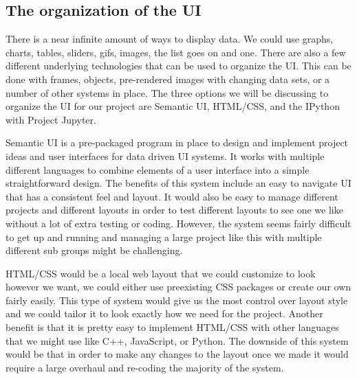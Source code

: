 \documentclass[10pt,draftclsnofoot,onecolumn]{IEEEtran}
\begin{document}
\subsection{The organization of the UI}

There is a near infinite amount of ways to display data. We could use graphs, charts, tables, sliders, gifs, images, the list goes on and one. There are also a few different underlying technologies that can be used to organize the UI. This can be done with frames, objects, pre-rendered images with changing data sets, or a number of other systems in place. The three options we will be discussing to organize the UI for our project are Semantic UI, HTML/CSS, and the IPython with Project Jupyter. \par

Semantic UI is a pre-packaged program in place to design and implement project ideas and user interfaces for data driven UI systems. It works with multiple different languages to combine elements of a user interface into a simple straightforward design. The benefits of this system include an easy to navigate UI that has a consistent feel and layout. It would also be easy to manage different projects and different layouts in order to test different layouts to see one we like without a lot of extra testing or coding. However, the system seems fairly difficult to get up and running and managing a large project like this with multiple different sub groups might be challenging. \par

HTML/CSS would be a local web layout that we could customize to look however we want, we could either use preexisting CSS packages or create our own fairly easily. This type of system would give us the most control over layout style and we could tailor it to look exactly how we need for the project. Another benefit is that it is pretty easy to implement HTML/CSS with other languages that we might use like C++, JavaScript, or Python. The downside of this system would be that in order to make any changes to the layout once we made it would require a large overhaul and re-coding the majority of the system. \par
\end{document}
